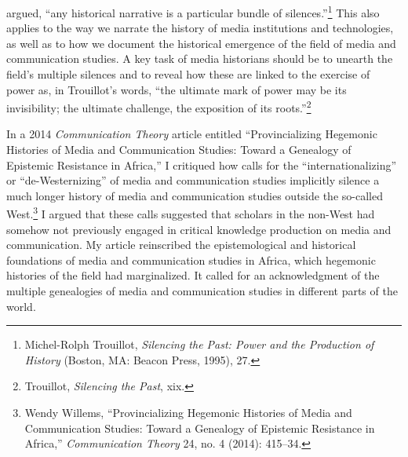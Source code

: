 \documentclass{tufte-handout}
\begin{document}
\begin{titlepage}
 argued, ``any historical narrative is a
particular bundle of silences.''\footnote{Michel-Rolph Trouillot,
  \emph{Silencing the Past: Power and the Production of History}
  (Boston, MA: Beacon Press, 1995), 27.} This also applies to the way we
narrate the history of media institutions and technologies, as well as
to how we document the historical emergence of the field of media and
communication studies. A key task of media historians should be to
unearth the field's multiple silences and to reveal how these are linked
to the exercise of power as, in Trouillot's words, ``the ultimate mark
of power may be its invisibility; the ultimate challenge, the exposition
of its roots.''\footnote{Trouillot, \emph{Silencing the Past}, xix.}

In a 2014 \emph{Communication Theory} article entitled ``Provincializing
Hegemonic Histories of Media and Communication Studies: Toward a
Genealogy of Epistemic Resistance in Africa,'' I critiqued how calls for
the ``internationalizing'' or ``de-Westernizing'' of media and
communication studies implicitly silence a much longer history of media
and communication studies outside the so-called West.\footnote{Wendy
  Willems, ``Provincializing Hegemonic Histories of Media and
  Communication Studies: Toward a Genealogy of Epistemic Resistance in
  Africa,'' \emph{Communication Theory} 24, no. 4 (2014): 415--34.} I
argued that these calls suggested that scholars in the non-West had
somehow not previously engaged in critical knowledge production on media
and communication. My article reinscribed the epistemological and
historical foundations of media and communication studies in Africa,
which hegemonic histories of the field had marginalized. It called for
an acknowledgment of the multiple genealogies of media and communication
studies in different parts of the world.

\enlargethispage{2\baselineskip}

\vspace*{2em}





 \end{titlepage}
\end{document}
